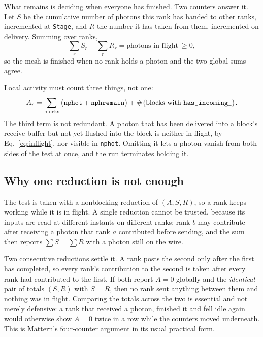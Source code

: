 \documentclass[11pt]{article}
\begin{document}
What remains is deciding when everyone has finished. Two counters answer it. Let $S$ be the
cumulative number of photons this rank has handed to other ranks, incremented at
\texttt{Stage}, and $R$ the number it has taken from them, incremented on delivery. Summing
over ranks,
\begin{equation}
  \sum_r S_r - \sum_r R_r = \text{photons in flight} \ \geq 0 ,
  \label{eq:inflight}
\end{equation}
so the mesh is finished when no rank holds a photon and the two global sums agree.

Local activity must count three things, not one:
\begin{equation}
  A_r = \sum_{\rm blocks} \big( \texttt{nphot} + \texttt{nphremain} \big)
        + \#\{\text{blocks with } \texttt{has\_incoming\_}\} .
  \label{eq:active}
\end{equation}
The third term is not redundant. A photon that has been delivered into a block's receive
buffer but not yet flushed into the block is neither in flight, by
Eq.~\eqref{eq:inflight}, nor visible in \texttt{nphot}. Omitting it lets a photon vanish
from both sides of the test at once, and the run terminates holding it.

\subsection{Why one reduction is not enough}

The test is taken with a nonblocking reduction of $(A, S, R)$, so a rank keeps working
while it is in flight. A single reduction cannot be trusted, because its inputs are read at
different instants on different ranks: rank $b$ may contribute after receiving a photon
that rank $a$ contributed before sending, and the sum then reports $\sum S = \sum R$ with a
photon still on the wire.

Two consecutive reductions settle it. A rank posts the second only after the first has
completed, so every rank's contribution to the second is taken after every rank had
contributed to the first. If both report $A = 0$ globally and the \emph{identical} pair of
totals $(S, R)$ with $S = R$, then no rank sent anything between them and nothing was in
flight. Comparing the totals across the two is essential and not merely defensive: a rank
that received a photon, finished it and fell idle again would otherwise show $A = 0$ twice
in a row while the counters moved underneath. This is Mattern's four-counter argument in
its usual practical form.
\end{document}
